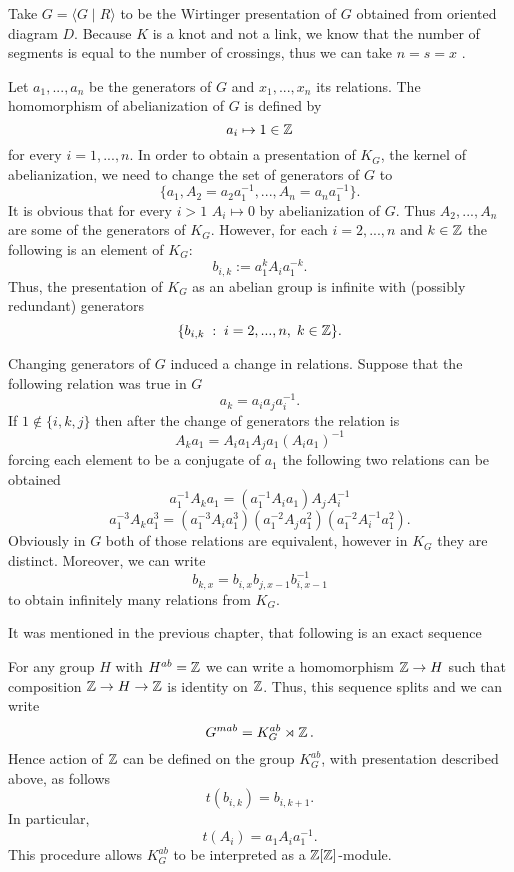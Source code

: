 Take $G=\langle G\;|\;R\rangle$ to be the Wirtinger presentation of $G$ obtained from oriented diagram $D$. Because $K$ is a knot and not a link, we know that the number of segments is equal to the number of crossings, thus we can take $n=s=x$ \cite{julia_private}.

Let $a_1,...,a_n$ be the generators of $G$ and $x_1,...,x_n$ its relations. The homomorphism of abelianization of $G$ is defined by 
$$a_i\mapsto 1\in\operatorname{\mathbb{Z}}$$ 
for every $i=1,...,n$. In order to obtain a presentation of $K_G$, the kernel of abelianization, we need to change the set of generators of $G$ to 
$$\{a_1, A_2=a_2a_1^{-1},..., A_n=a_na_1^{-1}\}.$$
It is obvious that for every $i>1$ $A_i\mapsto0$ by abelianization of $G$. Thus $A_2,...,A_n$ are some of the generators of $K_G$. However, for each $i=2,...,n$ and $k\in\operatorname{\mathbb{Z}}$ the following is an element of $K_G$:
$$b_{i, k}:=a_1^k A_i a_1^{-k}.$$
Thus, the presentation of $K_G$ as an abelian group is infinite with (possibly redundant) generators 
$$\{b_{i,k}\;:\;i=2,...,n,\;k\in\operatorname{\mathbb{Z}}\}.$$

Changing generators of $G$ induced a change in relations. Suppose that the following relation was true in $G$
$$a_k=a_ia_ja_i^{-1}.$$
If $1\notin\{i,k,j\}$ then after the change of generators the relation is
$$ A_ka_1 = A_ia_1 A_ja_1 (A_ia_1)^{-1}
$$
forcing each element to be a conjugate of $a_1$ the following two relations can be obtained
$$ a_1^{-1}A_ka_1=(a_1^{-1} A_i a_1)A_jA_i^{-1}
$$
$$
a_1^{-3} A_k a_1^3 = (a_1^{-3} A_i a_1^3) (a_1^{-2} A_j a_1^2) (a_1^{-2} A_i^{-1} a_1^2).
$$
Obviously in $G$ both of those relations are equivalent, however in $K_G$ they are distinct. Moreover, we can write 
$$
b_{k, x}=b_{i, x}b_{j, x-1}b_{i, x-1}^{-1}
$$
to obtain infinitely many relations from $K_G$.

It was mentioned in the previous chapter, that following is an exact sequence
\begin{center}
\end{center}
For any group $H$ with $H^{ab}=\operatorname{\mathbb{Z}}$ we can write a homomorphism $\operatorname{\mathbb{Z}}\to H$ such that composition $\operatorname{\mathbb{Z}}\to H\to \operatorname{\mathbb{Z}}$ is identity on $\operatorname{\mathbb{Z}}$. Thus, this sequence splits and we can write 
$$G^{mab}=K^{ab}_G\rtimes \operatorname{\mathbb{Z}}.$$ 
Hence action of $\operatorname{\mathbb{Z}}$ can be defined on the group $K^{ab}_G$, with presentation described above, as follows 
$$t(b_{i, k})=b_{i, k+1}.$$
In particular, 
$$t(A_i)=a_1 A_i a_1^{-1}.$$
This procedure allows $K_G^{ab}$ to be interpreted as a $\operatorname{\mathbb{Z}}[\operatorname{\mathbb{Z}}]$-module.

